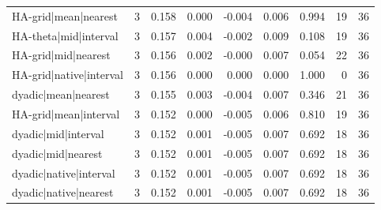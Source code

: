 \begin{tabular}{lrrrrrrrr}
HA-grid|mean|nearest & 3 & 0.158 & 0.000 & -0.004 & 0.006 & 0.994 & 19 & 36 \\
HA-theta|mid|interval & 3 & 0.157 & 0.004 & -0.002 & 0.009 & 0.108 & 19 & 36 \\
HA-grid|mid|nearest & 3 & 0.156 & 0.002 & -0.000 & 0.007 & 0.054 & 22 & 36 \\
HA-grid|native|interval & 3 & 0.156 & 0.000 & 0.000 & 0.000 & 1.000 & 0 & 36 \\
dyadic|mean|nearest & 3 & 0.155 & 0.003 & -0.004 & 0.007 & 0.346 & 21 & 36 \\
HA-grid|mean|interval & 3 & 0.152 & 0.000 & -0.005 & 0.006 & 0.810 & 19 & 36 \\
dyadic|mid|interval & 3 & 0.152 & 0.001 & -0.005 & 0.007 & 0.692 & 18 & 36 \\
dyadic|mid|nearest & 3 & 0.152 & 0.001 & -0.005 & 0.007 & 0.692 & 18 & 36 \\
dyadic|native|interval & 3 & 0.152 & 0.001 & -0.005 & 0.007 & 0.692 & 18 & 36 \\
dyadic|native|nearest & 3 & 0.152 & 0.001 & -0.005 & 0.007 & 0.692 & 18 & 36 \\
\bottomrule
\end{tabular}
